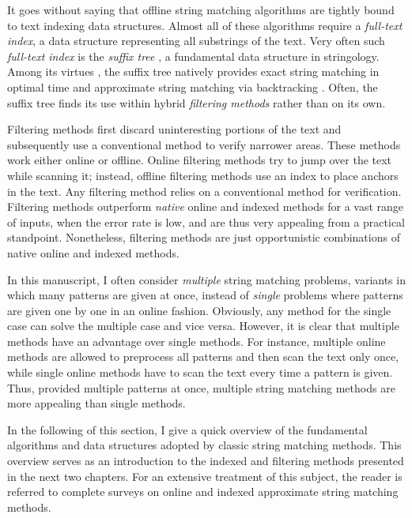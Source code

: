 It goes without saying that offline string matching algorithms are tightly bound to text indexing data structures.
Almost all of these algorithms require a \emph{full-text index}, \ie a data structure representing all substrings of the text.
Very often such \emph{full-text index} is the \emph{suffix tree} \citep{Weiner1973}, a fundamental data structure in stringology.
Among its virtues \citep{Apostolico1985}, the suffix tree natively provides exact string matching in optimal time and approximate string matching via backtracking \citep{Ukkonen1993}.
Often, the suffix tree finds its use within hybrid \emph{filtering methods} rather than on its own.

Filtering methods first discard uninteresting portions of the text and subsequently use a conventional method to verify narrower areas.
These methods work either online or offline.
Online filtering methods try to jump over the text while scanning it; instead, offline filtering methods use an index to place anchors in the text.
Any filtering method relies on a conventional method for verification.
Filtering methods outperform \emph{native} online and indexed methods for a vast range of inputs, \ie when the error rate is low, and are thus very appealing from a practical standpoint.
Nonetheless, filtering methods are just opportunistic combinations of native online and indexed methods.

In this manuscript, I often consider \emph{multiple} string matching problems, \ie variants in which many patterns are given at once, instead of \emph{single} problems where patterns are given one by one in an online fashion.
Obviously, any method for the single case can solve the multiple case and vice versa.
However, it is clear that multiple methods have an advantage over single methods.
For instance, multiple online methods are allowed to preprocess all patterns and then scan the text only once, while single online methods have to scan the text every time a pattern is given.
Thus, provided multiple patterns at once, multiple string matching methods are more appealing than single methods.

In the following of this section, I give a quick overview of the fundamental algorithms and data structures adopted by classic string matching methods.
This overview serves as an introduction to the indexed and filtering methods presented in the next two chapters.
For an extensive treatment of this subject, the reader is referred to complete surveys on online \citep{Navarro2001a} and indexed \citep{Navarro2001} approximate string matching methods.

